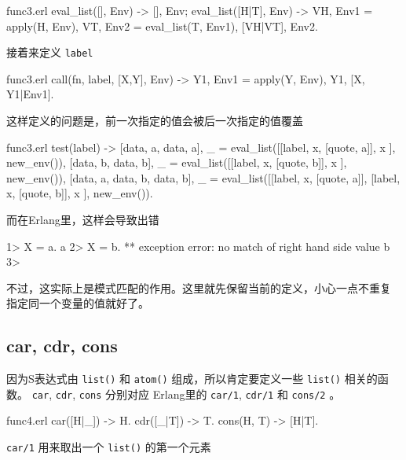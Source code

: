 \documentclass[preview,multi,crop=false,border=1in,class=memoir]{standalone}
\begin{document}
\begin{preview-page}
\begin{SourceCode}[36][41]{func3.erl}
eval_list([], Env) ->
    {[], Env};
eval_list([H|T], Env) ->
    {VH, Env1} = apply(H, Env),
    {VT, Env2} = eval_list(T, Env1),
    {[VH|VT], Env2}.
\end{SourceCode}

接着来定义 \verb|label|

\begin{SourceCode}[26][28]{func3.erl}
call({fn, label}, [X,Y], Env) ->
    {Y1, Env1} = apply(Y, Env),
    {Y1, [{X, Y1}|Env1]}.
\end{SourceCode}

这样定义的问题是，前一次指定的值会被后一次指定的值覆盖

\begin{SourceCode}[49][62]{func3.erl}
test(label) ->
    {[{data, a}, {data, a}], _} =
        eval_list([[label, x, [quote, a]],
                   x
                  ], new_env()),
    {[{data, b}, {data, b}], _} =
        eval_list([[label, x, [quote, b]],
                   x
                  ], new_env()),
    {[{data, a}, {data, b}, {data, b}], _} =
        eval_list([[label, x, [quote, a]],
                   [label, x, [quote, b]],
                   x
                  ], new_env()).
\end{SourceCode}

而在Erlang里，这样会导致出错

\begin{ErlangShellSession}
1> X = a.
a
2> X = b.
** exception error: no match of right hand side value b
3>
\end{ErlangShellSession}

不过，这实际上是模式匹配的作用。这里就先保留当前的定义，小心一点不重复
指定同一个变量的值就好了。

\subsection{car, cdr, cons}

因为S表达式由 \verb|list()| 和 \verb|atom()| 组成，所以肯定要定义一些
\verb|list()| 相关的函数。 \verb|car|, \verb|cdr|, \verb|cons| 分别对应
Erlang里的 \verb|car/1|, \verb|cdr/1| 和 \verb|cons/2| 。

\begin{SourceCode}[57][59]{func4.erl}
car([H|_]) -> H.
cdr([_|T]) -> T.
cons(H, T) -> [H|T].
\end{SourceCode}

\verb|car/1| 用来取出一个 \verb|list()| 的第一个元素


\end{preview-page}
\end{document}
